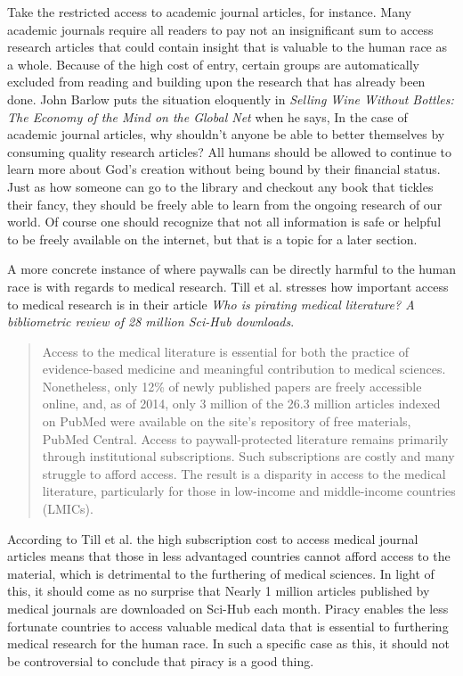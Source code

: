 \documentclass[onecolumn, 12pt]{article}
\begin{document}
Take the restricted access to academic journal articles, for instance. Many academic
journals require all readers to pay not an insignificant sum to access research articles
that could contain insight that is valuable to the human race as a whole. Because of the
high cost of entry, certain groups are automatically excluded from reading and building
upon the research that has already been done. John Barlow puts the situation eloquently in
\textit{Selling Wine Without Bottles: The Economy of the Mind on the Global Net} when he
says,  In the case of academic journal articles, why shouldn't anyone be
able to better themselves by consuming quality research articles? All humans should be
allowed to continue to learn more about God's creation without being bound by their
financial status. Just as how someone can go to the library and checkout any book that
tickles their fancy, they should be freely able to learn from the ongoing research of our
world. Of course one should recognize that not all information is safe or helpful to be
freely available on the internet, but that is a topic for a later section.

A more concrete instance of where paywalls can be directly harmful to the human race is
with regards to medical research. Till et al. stresses how important access to medical
research is in their article \textit{Who is pirating medical literature? A bibliometric
review of 28 million Sci-Hub downloads}. \blockcquote{till:medical-literature} {Access to
the medical literature is essential for both the practice of evidence-based medicine and
meaningful contribution to medical sciences. Nonetheless, only 12\% of newly published
papers are freely accessible online, and, as of 2014, only 3 million of the 26.3 million
articles indexed on PubMed were available on the site's repository of free materials,
PubMed Central. Access to paywall-protected literature remains primarily through
institutional subscriptions. Such subscriptions are costly and many struggle to afford
access. The result is a disparity in access to the medical literature, particularly for
those in low-income and middle-income countries (LMICs).}
According to Till et al. the high subscription cost to access medical journal articles
means that those in less advantaged countries cannot afford access to the material, which
is detrimental to the furthering of medical sciences. In light of this, it should come as
no surprise that  {Nearly 1 million articles published
by medical journals are downloaded on Sci-Hub each month.} Piracy enables the less
fortunate countries to access valuable medical data that is essential to furthering
medical research for the human race. In such a specific case as this, it should not be
controversial to conclude that piracy is a good thing.
\end{document}
